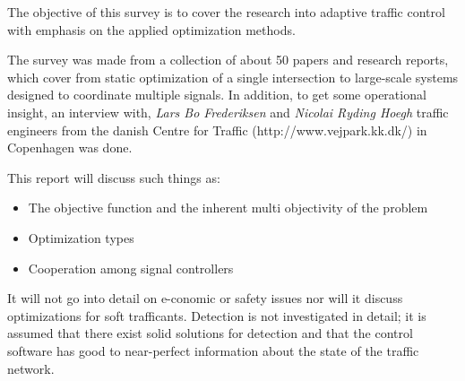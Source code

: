 The objective of this survey is to cover the research into adaptive traffic control with emphasis on the applied optimization methods.

The survey was made from a collection of about 50 papers and research reports, which cover from static optimization of a single intersection to large-scale systems designed to coordinate multiple signals. In addition, to get some operational insight, an interview with, \textit{Lars Bo Frederiksen} and \textit{Nicolai Ryding Hoegh} traffic engineers from the danish Centre for Traffic (http://www.vejpark.kk.dk/) in Copenhagen was done.

This report will discuss such things as:

\begin{itemize}
\item The objective function and the inherent multi objectivity of the problem
\item Optimization types
\item Cooperation among signal controllers
\end{itemize}

It will not go into detail on e-conomic or safety issues nor will it discuss optimizations for soft trafficants. Detection is not investigated in detail; it is assumed that there exist solid solutions for detection and that the control software has good to near-perfect information about the state of the traffic network.
